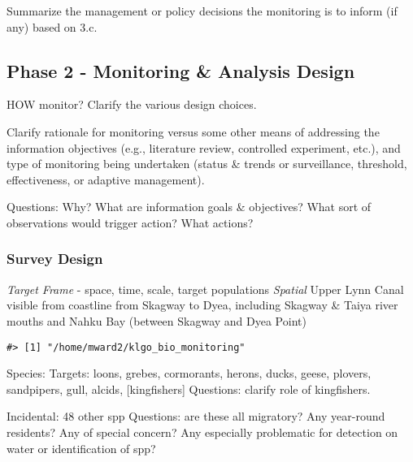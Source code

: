 \documentclass[]{article}
\begin{document}
Summarize the management or policy decisions the monitoring is to inform
(if any) based on 3.c.

\subsection{Phase 2 - Monitoring \& Analysis
Design}\label{phase-2---monitoring-analysis-design}

HOW monitor? Clarify the various design choices.

Clarify rationale for monitoring versus some other means of addressing
the information objectives (e.g., literature review, controlled
experiment, etc.), and type of monitoring being undertaken (status \&
trends or surveillance, threshold, effectiveness, or adaptive
management).

Questions: Why? What are information goals \& objectives? What sort of
observations would trigger action? What actions?

\subsubsection{Survey Design}\label{survey-design}

\emph{Target Frame} - space, time, scale, target populations
\emph{Spatial} Upper Lynn Canal visible from coastline from Skagway to
Dyea, including Skagway \& Taiya river mouths and Nahku Bay (between
Skagway and Dyea Point)

\begin{verbatim}
#> [1] "/home/mward2/klgo_bio_monitoring"
\end{verbatim}

Species: Targets: loons, grebes, cormorants, herons, ducks, geese,
plovers, sandpipers, gull, alcids, {[}kingfishers{]} Questions: clarify
role of kingfishers.

Incidental: 48 other spp Questions: are these all migratory? Any
year-round residents? Any of special concern? Any especially problematic
for detection on water or identification of spp?
\end{document}
